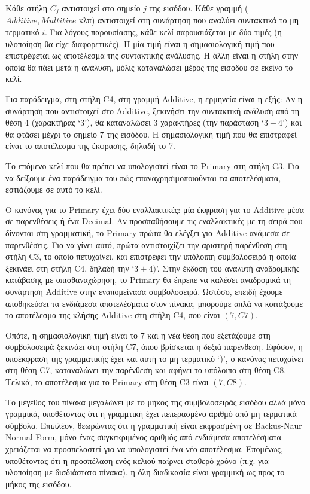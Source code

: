 \documentclass[diploma]{softlab-thesis}
\begin{document}
Κάθε στήλη $C_j$ αντιστοιχεί στο σημείο $j$ της εισόδου.
Κάθε γραμμή ($Additive, Multitive$ κλπ) αντιστοιχεί στη συνάρτηση που αναλύει συντακτικά το μη τερματικό $i$.
Για λόγους παρουσίασης, κάθε κελί παρουσιάζεται με δύο τιμές (η υλοποίηση θα είχε διαφορετικές).
Η μία τιμή είναι η σημασιολογική τιμή που επιστρέφεται ως αποτέλεσμα της συντακτικής ανάλυσης.
Η άλλη είναι η στήλη στην οποία θα πάει μετά η ανάλυση, μόλις καταναλώσει μέρος της εισόδου σε εκείνο το κελί.

\newpage

Για παράδειγμα, στη στήλη C4, στη γραμμή Additive, η ερμηνεία είναι η εξής: 
Αν η συνάρτηση που αντιστοιχεί στο Additive, ξεκινήσει την συντακτική ανάλυση από τη θέση 4 (χαρακτήρας `3'), θα καταναλώσει 3 χαρακτήρες (την παράσταση `$3+4$') και θα φτάσει μέχρι το σημείο 7 της εισόδου. 
Η σημασιολογική τιμή που θα επιστραφεί είναι το αποτέλεσμα της έκφρασης, δηλαδή το 7.

Το επόμενο κελί που θα πρέπει να υπολογιστεί είναι το Primary στη στήλη C3.
Για να δείξουμε ένα παράδειγμα του πώς επαναχρησιμοποιούνται τα αποτελέσματα, εστιάζουμε σε αυτό το κελί.

Ο κανόνας για το Primary έχει δύο εναλλακτικές: 
μία έκφραση για το Additive μέσα σε παρενθέσεις ή ένα Decimal.
Αν προσπαθήσουμε τις εναλλακτικές με τη σειρά που δίνονται στη γραμματική, το Primary πρώτα θα ελέγξει για Additive ανάμεσα σε παρενθέσεις.
Για να γίνει αυτό, πρώτα αντιστοιχίζει την αριστερή παρένθεση στη στήλη C3, το οποίο πετυχαίνει, και επιστρέφει την υπόλοιπη συμβολοσειρά η οποία ξεκινάει στη στήλη C4, δηλαδή την `$3+4)$'.
Στην έκδοση του αναλυτή αναδρομικής κατάβασης με οπισθαναχώρηση, το Primary θα έπρεπε να καλέσει αναδρομικά τη συνάρτηση Additive στην εναπομείνασα συμβολοσειρά. 
Ωστόσο, επειδή έχουμε αποθηκεύσει τα ενδιάμεσα αποτελέσματα στον πίνακα, μπορούμε απλά να κοιτάξουμε το αποτέλεσμα της κλήσης Additive στη στήλη C4, που είναι $(7,C7)$. 

Οπότε, η σημασιολογική τιμή είναι το 7 και η νέα θέση που εξετάζουμε στη συμβολοσειρά ξεκινάει στη στήλη C7, όπου βρίσκεται η δεξιά παρένθεση.
Εφόσον, η υποέκφραση της γραμματικής έχει και αυτή το μη τερματικό `)', ο κανόνας πετυχαίνει στη θέση C7, καταναλώνει την παρένθεση και αφήνει το υπόλοιπο στη θέση C8.
Τελικά, το αποτέλεσμα για το Primary στη θέση C3 είναι $(7, C8)$.

Το μέγεθος του πίνακα μεγαλώνει με το μήκος της συμβολοσειράς εισόδου αλλά μόνο γραμμικά, υποθέτοντας ότι η γραμμτική έχει πεπερασμένο αριθμό από μη τερματικά σύμβολα.
Επιπλέον, θεωρώντας ότι η γραμματική είναι εκφρασμένη σε Backus-Naur Normal Form, μόνο ένας συγκεκριμένος αριθμός από ενδιάμεσα αποτελέσματα χρειάζεται να προσπελαστεί για να υπολογιστεί ένα νέο αποτέλεσμα.
Επομένως, υποθέτοντας ότι η προσπέλαση ενός κελιού παίρνει σταθερό χρόνο (π.χ. για υλοποίηση με δισδιάστατο πίνακα), η όλη διαδικασία είναι γραμμική ως προς το μήκος της εισόδου.
\end{document}
